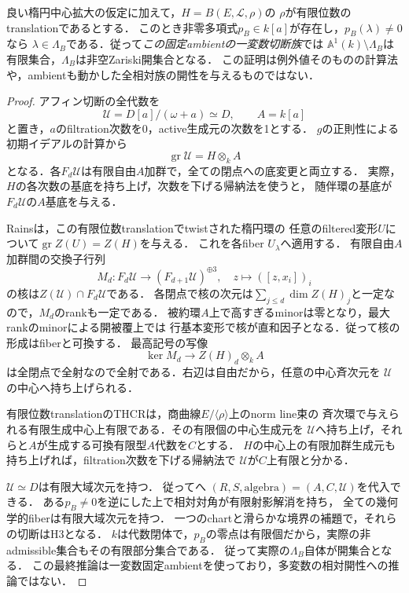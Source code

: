 \begin{theorem}[有限位数楕円境界の場合の有限例外と開性]
\label{thm:r13-torsion-finite-exceptions}
良い楕円中心拡大の仮定に加えて，$H=B(E,\mathcal L,\rho)$の
$\rho$が有限位数のtranslationであるとする．
このとき非零多項式$p_B\in k[a]$が存在し，$p_B(\lambda)\ne0$なら
$\lambda\in\Lambda_B$である．従って\emph{この固定ambientの一変数切断族}では
$\mathbb A^1(k)\setminus\Lambda_B$は有限集合，$\Lambda_B$は非空Zariski開集合となる．
この証明は例外値そのものの計算法や，ambientも動かした全相対族の開性を与えるものではない．
\end{theorem}
\begin{proof}
アフィン切断の全代数を
\[
 \mathcal U=D[a]/(\omega+a)\simeq D,\qquad A=k[a]
\]
と置き，$a$のfiltration次数を0，active生成元の次数を1とする．
$g$の正則性による初期イデアルの計算から
\[
 \operatorname{gr}\mathcal U=H\otimes_k A
\]
となる．各$F_d\mathcal U$は有限自由$A$加群で，全ての閉点への底変更と両立する．
実際，$H$の各次数の基底を持ち上げ，次数を下げる帰納法を使うと，
随伴環の基底が$F_d\mathcal U$の$A$基底を与える．

Rains\cite[Theorem 2.13]{RainsCut}は，この有限位数translationでtwistされた楕円環の
任意のfiltered変形$U$について$\operatorname{gr}Z(U)=Z(H)$を与える．
これを各fiber $U_\lambda$へ適用する．
有限自由$A$加群間の交換子行列
\[
 M_d:F_d\mathcal U\longrightarrow(F_{d+1}\mathcal U)^{\oplus3},
       \quad z\longmapsto([z,x_i])_i
\]
の核は$Z(\mathcal U)\cap F_d\mathcal U$である．
各閉点で核の次元は$\sum_{j\le d}\dim Z(H)_j$と一定なので，$M_d$のrankも一定である．
被約環$A$上で高すぎるminorは零となり，最大rankのminorによる開被覆上では
行基本変形で核が直和因子となる．従って核の形成はfiberと可換する．
最高記号の写像
\[
 \ker M_d\longrightarrow Z(H)_d\otimes_k A
\]
は全閉点で全射なので全射である．右辺は自由だから，任意の中心斉次元を
$\mathcal U$の中心へ持ち上げられる．

有限位数translationのTHCRは，商曲線$E/\langle\rho\rangle$上のnorm line束の
斉次環で与えられる有限生成中心上有限である．その有限個の中心生成元を
$\mathcal U$へ持ち上げ，それらと$A$が生成する可換有限型$A$代数を$C$とする．
$H$の中心上の有限加群生成元も持ち上げれば，filtration次数を下げる帰納法で
$\mathcal U$が$C$上有限と分かる．

$\mathcal U\simeq D$は有限大域次元を持つ．
従って\cite[Proposition 2.1, proof steps (6)--(8)]{RSV}へ
$(R,S,\text{algebra})=(A,C,\mathcal U)$を代入できる．
ある$p_B\ne0$を逆にした上で相対対角が有限射影解消を持ち，
全ての幾何学的fiberは有限大域次元を持つ．
一つのchartと滑らかな境界の補題で，それらの切断はH3となる．
$k$は代数閉体で，$p_B$の零点は有限個だから，実際の非admissible集合もその有限部分集合である．
従って実際の$\Lambda_B$自体が開集合となる．
この最終推論は一変数固定ambientを使っており，多変数の相対開性への推論ではない．
\end{proof}

